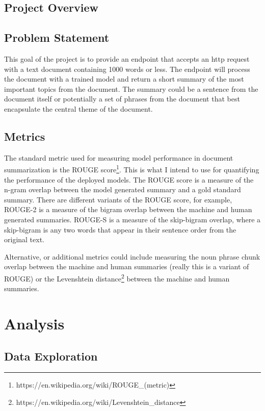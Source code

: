 \documentclass{article}
\begin{document}
\subsection{Project Overview}

\subsection{Problem Statement}

This goal of the project is to provide an endpoint that accepts an http request
with a text document containing 1000 words or less. The endpoint will process
the document with a trained model and return a short summary of the most
important topics from the document. The summary could be a sentence from the
document itself or potentially a set of phrases from the document that best
encapsulate the central theme of the document.

\subsection{Metrics}

The standard metric used for measuring model performance in document
summarization is the ROUGE
score\footnote{https://en.wikipedia.org/wiki/ROUGE\_(metric)}.
This is what I intend to use for quantifying the performance of the deployed
models. The ROUGE score is a measure of the n-gram overlap between the model
generated summary and a gold standard summary. There are different variants of
the ROUGE score, for example, ROUGE-2 is a measure of the bigram overlap between
the machine and human generated summaries. ROUGE-S is a measure of the
skip-bigram overlap, where a skip-bigram is any two words that appear in their
sentence order from the original text.

Alternative, or additional metrics could include measuring the noun phrase chunk
overlap between the machine and human summaries (really this is a variant of
ROUGE) or the Levenshtein
distance\footnote{https://en.wikipedia.org/wiki/Levenshtein\_distance} between
the machine and human summaries.

\section{Analysis}

\subsection{Data Exploration}
\end{document}
